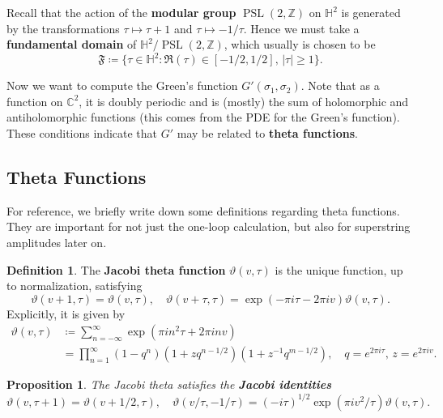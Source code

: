 \documentclass{report}
\theoremstyle{plain}
\newtheorem{proposition}[theorem]{Proposition}
\theoremstyle{definition}
\newtheorem{definition}[theorem]{Definition}
\theoremstyle{remark}
\newcommand{\bC}{\mathbb{C}}
\newcommand{\bZ}{\mathbb{Z}}
\newcommand{\bH}{\mathbb{H}}
\newcommand{\fF}{\mathfrak{F}}
\DeclareMathOperator{\PSL}{PSL}
\begin{document}
Recall that the action of the {\bf modular group} $\PSL(2, \bZ)$ on
$\bH^2$ is generated by the transformations $\tau \mapsto \tau+1$ and
$\tau \mapsto -1/\tau$. Hence we must take a {\bf fundamental domain}
of $\bH^2/\PSL(2, \bZ)$, which usually is chosen to be
\[ \fF \coloneqq \{\tau \in \bH^2 : \Re(\tau) \in [-1/2, 1/2], \, |\tau| \ge 1\}. \]

Now we want to compute the Green's function $G'(\sigma_1, \sigma_2)$.
Note that as a function on $\bC^2$, it is doubly periodic and is
(mostly) the sum of holomorphic and antiholomorphic functions (this
comes from the PDE for the Green's function). These conditions
indicate that $G'$ may be related to {\bf theta functions}.

\subsection{Theta Functions}

For reference, we briefly write down some definitions regarding theta
functions. They are important for not just the one-loop calculation,
but also for superstring amplitudes later on.

\begin{definition}
  The {\bf Jacobi theta function} $\vartheta(v, \tau)$ is the unique
  function, up to normalization, satisfying
  \[ \vartheta(v+1, \tau) = \vartheta(v, \tau), \quad \vartheta(v + \tau, \tau) = \exp(-\pi i \tau - 2\pi i v) \vartheta(v, \tau). \]
  Explicitly, it is given by
  \begin{align*}
    \vartheta(v, \tau)
    &\coloneqq \sum_{n=-\infty}^\infty \exp\left(\pi i n^2\tau + 2\pi inv\right) \\
    &= \prod_{n=1}^\infty (1 - q^n) (1 + z q^{n-1/2})(1 + z^{-1}q^{m-1/2}), \quad q = e^{2\pi i\tau}, \, z = e^{2\pi iv}.
  \end{align*}
\end{definition}

\begin{proposition}
  The Jacobi theta satisfies the {\bf Jacobi identities}
  \[ \vartheta(v, \tau + 1) = \vartheta(v + 1/2, \tau), \quad \vartheta(v/\tau, -1/\tau) = (-i\tau)^{1/2} \exp(\pi i v^2/\tau) \vartheta(v, \tau). \]
\end{proposition}
\end{document}
